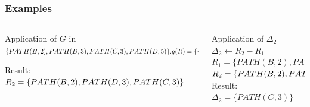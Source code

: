 \documentclass{beamer}
\begin{document}
\frame
{
	\frametitle{Examples}
	\begin{columns}	
	
	\begin{column}{0.5 \textwidth}
	
	Application of $G$ in $ \{ PATH(B,2), PATH(D,3), 
	\newline
	PATH(C,3), PATH(D,5) \}.
	\newline
	\newline
	g(R) = \{ <t,min_{<t,d_{1}> \in R}d_{1}> \mid
	\newline
	<t,d_{1}> \in R  \} $
	
	Result: \\
	$R_{2} = \{ PATH(B,2), PATH(D,3), 
	\newline
	PATH(C,3)\} $
	
	\end{column}
	
	\begin{column}{0.5\textwidth}
	
	Application of $\Delta_{2}$ \\
	$ \Delta_{2} \gets R_{2} - R_{1} $
	\\
	$ R_{1} = \{ PATH(B,2), PATH(D,3) \} $
	\\
	$ R_{2} = \{ PATH(B,2), PATH(D,3), 
	\newline
	PATH(C,3) \} $
	\\
	Result:\\
	$ \Delta_{2} = \{ PATH(C,3) \} $
	
	\end{column}
	
	\end{columns}	
}
\end{document}
